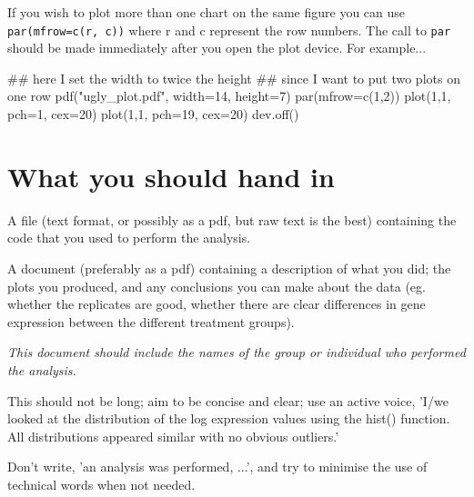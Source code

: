 \documentclass[11pt]{article}
\begin{document}
If you wish to plot more than one chart on the same figure
you can use \texttt{par(mfrow=c(r, c))} where r and c represent
the row numbers. The call to \texttt{par} should be made immediately after
you open the plot device. For example...

\begin{rcode}
## here I set the width to twice the height
## since I want to put two plots on one row
pdf("ugly_plot.pdf", width=14, height=7)
par(mfrow=c(1,2))
plot(1,1, pch=1, cex=20)
plot(1,1, pch=19, cex=20)
dev.off()
\end{rcode}

\section{What you should hand in}
A file (text format, or possibly as a pdf, but raw text
is the best) containing the code that you used to perform
the analysis.

A document (preferably as a pdf) containing a description of what
you did; the plots you produced, and any conclusions you can make about the
data (eg. whether the replicates are good, whether there are clear differences
in gene expression between the different treatment groups).

\emph{This document should include the names of the group or individual who performed
the analysis.}

This should not be long; aim to be concise and clear; use an active voice,
'I/we looked at the distribution of the log expression values using the hist() function.
All distributions appeared similar with no obvious outliers.'

Don't write, 'an analysis was performed, ...', and try to minimise the use
of technical words when not needed.
\end{document}
